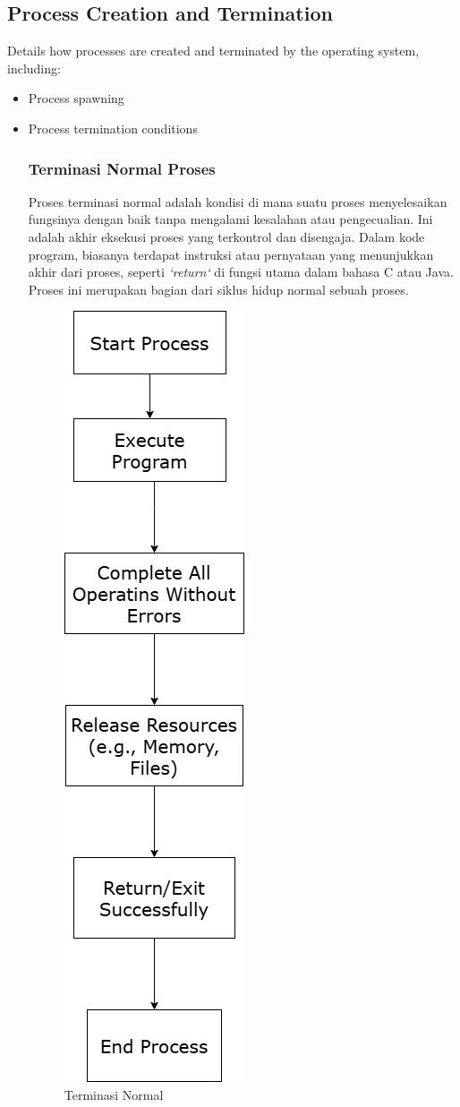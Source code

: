 \documentclass[12pt]{article}
\begin{document}
\subsection{Process Creation and Termination}
Details how processes are created and terminated by the operating system, including:
\begin{itemize}
    \item Process spawning
    \item Process termination conditions
    
    \subsubsection{Terminasi Normal Proses}
    
    \begin{itemize}
        Proses terminasi normal adalah kondisi di mana suatu proses menyelesaikan fungsinya dengan baik tanpa mengalami kesalahan atau pengecualian. Ini adalah akhir eksekusi proses yang terkontrol dan disengaja. Dalam kode program, biasanya terdapat instruksi atau pernyataan yang menunjukkan akhir dari proses, seperti \textit{`return`} di fungsi utama dalam bahasa C atau Java. Proses ini merupakan bagian dari siklus hidup normal sebuah proses.
    \end{itemize}

    \begin{figure}
        \centering
        \includegraphics[width=0.2\linewidth]{asset/Normal.png}
        \caption{Terminasi Normal}
        \label{fig:enter-label}
    \end{figure}
    

\end{itemize}
\end{document}
